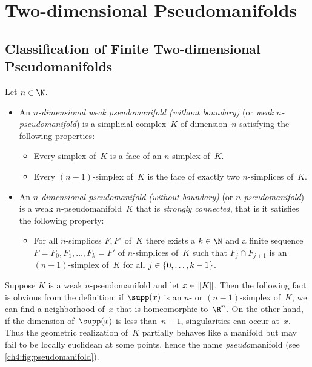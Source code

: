 \chapter{Two-dimensional Pseudomanifolds}
\section{Classification of Finite Two-dimensional Pseudomanifolds}
\begin{thDef}
    \label{ch4:def:pseudomanifold}
    Let $n\in\N$. 
    \begin{itemize}
        \item
            An \emph{$n$-dimensional weak pseudomanifold (without boundary)}
            (or \emph{weak $n$-pseudo\-manifold}) is a simplicial complex~$K$
            of dimension~$n$ satisfying the following properties:
            \begin{itemize}
                \item
                    Every simplex of~$K$ is a face of an $n$-simplex of~$K$.
                \item
                    Every $(n{-}1)$-simplex of~$K$ is the face of exactly two
                    $n$-simplices of~$K$.
            \end{itemize}
            
        \item
            An \emph{$n$-dimensional pseudomanifold (without boundary)} (or
            \emph{$n$-pseudomanifold}) is a weak $n$-pseudomanifold~$K$ that is
            \emph{strongly connected}, that is it satisfies the following
            property:
            \begin{itemize}
                \item
                    For all $n$-simplices $F,F'$ of~$K$ there exists a $k\in\N$ and a
                    finite sequence $F=F_0,F_1,\dots,F_k=F'$ of $n$-simplices of~$K$
                    such that  $F_j\cap F_{j+1}$ is an $(n{-}1)$-simplex of~$K$ 
                    for all $j\in\{0,\ldots,k-1\}$.
            \end{itemize}
    \end{itemize}
\end{thDef}

Suppose $K$ is a weak $n$-pseudomanifold and let $x\in\lVert K\rVert$.
Then the following fact is obvious from the definition:
if $\supp(x)$ is an $n$- or $(n{-}1)$-simplex of~$K$,
we can find a neighborhood of~$x$ that is homeomorphic
to~$\R^n$. On the other hand, if the dimension of~$\supp(x)$
is less than~$n{-}1$, singularities can occur at~$x$.
Thus the geometric realization of~$K$ partially behaves like a manifold but may
fail to be locally euclidean at some points, hence the name \emph{pseudo}manifold
(see \cref{ch4:fig:pseudomanifold}).

